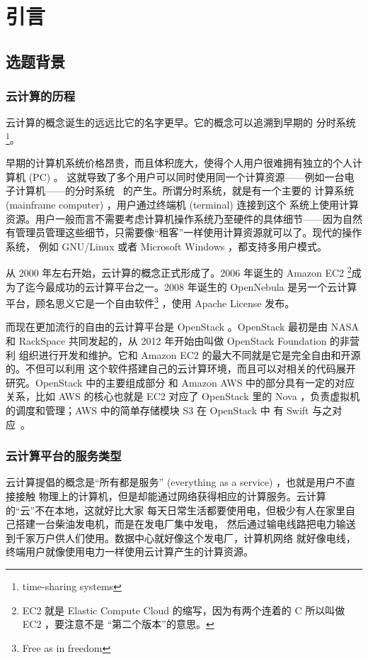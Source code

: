 \chapter{引言}
\label{cha:intro}

\section{选题背景}

\subsection{云计算的历程}

云计算的概念诞生的远远比它的名字更早。它的概念可以追溯到早期的
分时系统\footnote{time-sharing systems}。

早期的计算机系统价格昂贵，而且体积庞大，使得个人用户很难拥有独立的个人计算机 (PC) 。
这就导致了多个用户可以同时使用同一个计算资源——例如一台电子计算机——的分时系统
~\cite{timesharing}的产生。所谓分时系统，就是有一个主要的
计算系统 (mainframe computer) ，用户通过终端机 (terminal) 连接到这个
系统上使用计算资源。用户一般而言不需要考虑计算机操作系统乃至硬件的具体细节——因为自然
有管理员管理这些细节，只需要像“租客”一样使用计算资源就可以了。现代的操作系统，
例如 GNU/Linux 或者 Microsoft Windows ，都支持多用户模式。

从 2000 年左右开始，云计算的概念正式形成了。2006 年诞生的 Amazon EC2 \footnote{EC2
  就是 Elastic Compute Cloud 的缩写，因为有两个连着的 C 所以叫做 EC2 ，要注意不是
  “第二个版本”的意思。}成为了迄今最成功的云计算平台之一。2008 年诞生的 OpenNebula
是另一个云计算平台，顾名思义它是一个自由软件\footnote{Free as in freedom}
，使用 Apache License 发布。

而现在更加流行的自由的云计算平台是 OpenStack 。OpenStack 最初是由
 NASA 和 RackSpace 共同发起的，从 2012 年开始由叫做 OpenStack Foundation 的非营利
组织进行开发和维护。它和 Amazon EC2 的最大不同就是它是完全自由和开源的。不但可以利用
这个软件搭建自己的云计算环境，而且可以对相关的代码展开研究。OpenStack 中的主要组成部分
和 Amazon AWS 中的部分具有一定的对应关系，比如 AWS 的核心也就是 EC2 对应了 OpenStack
 里的 Nova ，负责虚拟机的调度和管理；AWS 中的简单存储模块 S3 在 OpenStack 中
有 Swift 与之对应~\cite{openstack}。

\subsection{云计算平台的服务类型}

云计算提倡的概念是“所有都是服务” (everything as a service) ，也就是用户不直接接触
物理上的计算机，但是却能通过网络获得相应的计算服务。云计算的“云”不在本地，这就好比大家
每天日常生活都要使用电，但极少有人在家里自己搭建一台柴油发电机，而是在发电厂集中发电，
然后通过输电线路把电力输送到千家万户供人们使用。数据中心就好像这个发电厂，计算机网络
就好像电线，终端用户就像使用电力一样使用云计算产生的计算资源。

